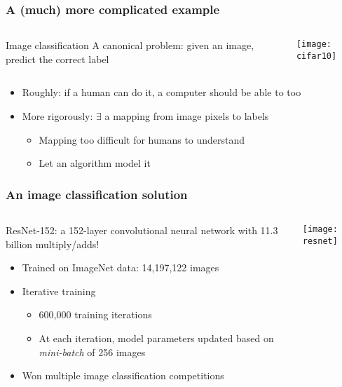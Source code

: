 \begin{frame}
    \frametitle{A (much) more complicated example}
    \begin{columns}
        \begin{column}{0.37\textwidth}
            \begin{block}{Image classification}
                A canonical problem: given an image, predict the correct label
            \end{block}
        \end{column}
        \begin{column}{0.63\textwidth}
            \texttt{[image: cifar10]}
        \end{column}
    \end{columns}

    \begin{itemize}
        \item Roughly: if a human can do it, a computer should be able to too
        \item More rigorously: $\exists$ a mapping from image pixels to labels
        \begin{itemize}
            \item Mapping too difficult for humans to understand
            \item Let an algorithm model it
        \end{itemize}
    \end{itemize}
\end{frame}

\begin{frame}
    \frametitle{An image classification solution}

    \begin{columns}
        \begin{column}{0.7\textwidth}
            ResNet-152: a 152-layer convolutional neural network with 11.3 billion multiply/adds! \citep{He15b}
            \begin{itemize}
                \item Trained on ImageNet data: 14,197,122 images
                \item Iterative training
                \begin{itemize}
                    \item 600,000 training iterations
                    \item At each iteration, model parameters updated based on \emph{mini-batch} of 256 images
                \end{itemize}
                \item Won multiple image classification competitions
            \end{itemize}
        \end{column}
        \begin{column}{0.3\textwidth}
            \texttt{[image: resnet]}
        \end{column}
    \end{columns}
\end{frame}

